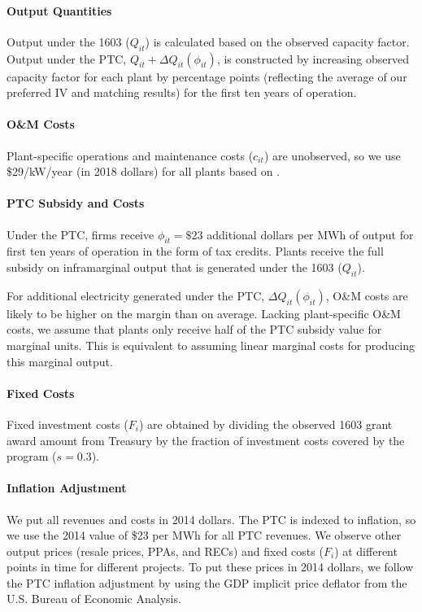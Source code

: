 \documentclass[12pt]{article}
\begin{document}
\paragraph*{Output Quantities}
Output under the 1603 ($Q_{it}$) is calculated based on the observed capacity factor. Output under the PTC, $Q_{it} + \Delta Q_{it}(\phi_{it})$, is constructed by increasing observed capacity factor for each plant by  \unskip percentage points (reflecting the average of our preferred IV and matching results) for the first ten years of operation.

\paragraph*{O\&M Costs}
Plant-specific operations and maintenance costs ($c_{it}$) are unobserved, so we use \$29/kW/year (in 2018 dollars) for all plants based on \cite{wiser_2018_2019}.

\paragraph*{PTC Subsidy and Costs}
Under the PTC, firms receive $\phi_{it} = \$23$ additional dollars per MWh of output for first ten years of operation in the form of tax credits. Plants receive the full subsidy on inframarginal output that is generated under the 1603 ($Q_{it}$).

For additional electricity generated under the PTC, $\Delta Q_{it}(\phi_{it})$, O\&M costs are likely to be higher on the margin than on average. Lacking plant-specific O\&M costs, we assume that plants only receive half of the PTC subsidy value for marginal units. This is equivalent to assuming linear marginal costs for producing this marginal output.

\paragraph*{Fixed Costs}
Fixed investment costs ($F_i$) are obtained by dividing the observed 1603 grant award amount from Treasury by the fraction of investment costs covered by the program ($s=0.3$).

\paragraph*{Inflation Adjustment}
We put all revenues and costs in 2014 dollars. The PTC is indexed to inflation, so we use the 2014 value of \$23 per MWh for all PTC revenues. We observe other output prices (resale prices, PPAs, and RECs) and fixed costs ($F_i$) at different points in time for different projects. To put these prices in 2014 dollars, we follow the PTC inflation adjustment by using the GDP implicit price deflator from the U.S. Bureau of Economic Analysis.
\end{document}
